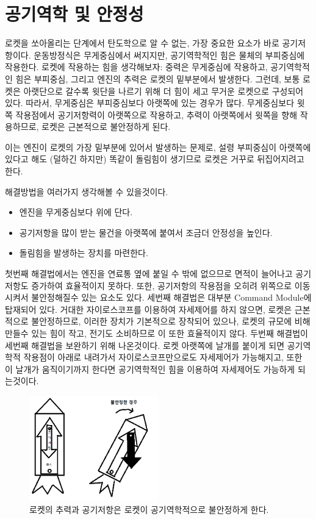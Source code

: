 \documentclass[9pt,twoside,openany]{amsbook}
\begin{document}
\section{공기역학 및 안정성}
로켓을 쏘아올리는 단계에서 탄도학으로 알 수 없는, 가장 중요한 요소가 바로 공기저항이다. 
운동방정식은 무게중심에서 써지지만, 공기역학적인 힘은 물체의 부피중심에 작용한다. 
로켓에 작용하는 힘을 생각해보자: 중력은 무게중심에 작용하고, 공기역학적인 힘은 부피중심, 그리고 엔진의 추력은 로켓의 밑부분에서 발생한다. 그런데, 보통 로켓은 아랫단으로 갈수록 윗단을 나르기 위해 더 힘이 세고 무거운 로켓으로 구성되어 있다. 따라서, 무게중심은 부피중심보다 아랫쪽에 있는 경우가 많다. 무게중심보다 윗쪽 작용점에서 공기저항력이 아랫쪽으로 작용하고, 추력이 아랫쪽에서 윗쪽을 향해 작용하므로, 로켓은 근본적으로 불안정하게 된다.

이는 엔진이 로켓의 가장 밑부분에 있어서 발생하는 문제로, 설령 부피중심이 아랫쪽에 있다고 해도 (덜하긴 하지만) 똑같이 돌림힘이 생기므로 로켓은 거꾸로 뒤집어지려고 한다.

해결방법을 여러가지 생각해볼 수 있을것이다.
\begin{itemize}
\item 엔진을 무게중심보다 위에 단다.
\item 공기저항을 많이 받는 물건을 아랫쪽에 붙여서 조금더 안정성을 높인다.
\item 돌림힘을 발생하는 장치를 마련한다.
\end{itemize}

첫번째 해결법에서는 엔진을 연료통 옆에 붙일 수 밖에 없으므로 면적이 늘어나고 공기저항도 증가하여 효율적이지 못하다. 또한, 공기저항의 작용점을 오히려 위쪽으로 이동시켜서 불안정해질수 있는 요소도 있다.
세번째 해결법은 대부분 Command Module에 탑재되어 있다. 거대한 자이로스코프를 이용하여 자세제어를 하지 않으면, 로켓은 근본적으로 불안정하므로, 이러한 장치가 기본적으로 장착되어 있으나, 로켓의 규모에 비해 만들수 있는 힘이 작고, 전기도 소비하므로 이 또한 효율적이지 않다.
두번째 해결법이 세번째 해결법을 보완하기 위해 나온것이다. 로켓 아랫쪽에 날개를 붙이게 되면 공기역학적 작용점이 아래로 내려가서 자이로스코프만으로도 자세제어가 가능해지고, 또한 이 날개가 움직이기까지 한다면 공기역학적인 힘을 이용하여 자세제어도 가능하게 되는것이다.

\begin{figure}
\caption{로켓의 추력과 공기저항은 로켓이 공기역학적으로 불안정하게 한다. }
\begin{center}
\includegraphics[width=0.5\textwidth]{aero.png}
\end{center}
\end{figure}
\end{document}
